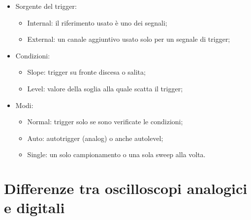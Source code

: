 \documentclass[12pt, letterpaper]{book}
\begin{document}
\begin{itemize}
    \item Sorgente del trigger:
    \begin{itemize}
        \item Internal: il riferimento usato è uno dei segnali;
        \item External: un canale aggiuntivo usato solo per un segnale di trigger;
    \end{itemize}
    \item Condizioni:
    \begin{itemize}
        \item Slope: trigger su fronte discesa o salita;
        \item Level: valore della soglia alla quale scatta il trigger;
    \end{itemize}
    \item Modi:
    \begin{itemize}
        \item Normal: trigger solo se sono verificate le condizioni;
        \item Auto: autotrigger (analog) o anche autolevel;
        \item Single: un solo campionamento o una sola sweep alla volta.
    \end{itemize}
\end{itemize}

\newpage
\section{Differenze tra oscilloscopi analogici e digitali}
\end{document}
